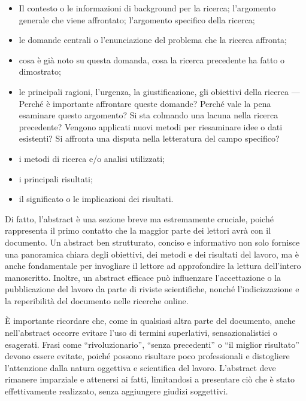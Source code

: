 \documentclass[9pt,a4paper,twoside]{rho-class/rho}
\begin{document}
\begin{itemize}
     \item Il contesto o le informazioni di background per la ricerca; l’argomento generale che viene affrontato; l’argomento specifico della ricerca;
     \item le domande centrali o l’enunciazione del problema che la ricerca affronta;
     \item cosa è già noto su questa domanda, cosa la ricerca precedente ha fatto o dimostrato;
     \item le principali ragioni, l’urgenza, la giustificazione, gli obiettivi della ricerca — Perché è importante affrontare queste domande? Perché vale la pena esaminare questo argomento? Si sta colmando una lacuna nella ricerca precedente? Vengono applicati nuovi metodi per riesaminare idee o dati esistenti? Si affronta una disputa nella letteratura del campo specifico?
     \item i metodi di ricerca e/o analisi utilizzati;
     \item i principali risultati;
     \item il significato o le implicazioni dei risultati.
 \end{itemize}

Di fatto, l’abstract è una sezione breve ma estremamente cruciale, poiché rappresenta il primo contatto che la maggior parte dei lettori avrà con il documento. Un abstract ben strutturato, conciso e informativo non solo fornisce una panoramica chiara degli obiettivi, dei metodi e dei risultati del lavoro, ma è anche fondamentale per invogliare il lettore ad approfondire la lettura dell’intero manoscritto. Inoltre, un abstract efficace può influenzare l’accettazione o la pubblicazione del lavoro da parte di riviste scientifiche, nonché l’indicizzazione e la reperibilità del documento nelle ricerche online.

È importante ricordare che, come in qualsiasi altra parte del documento, anche nell’abstract occorre evitare l’uso di termini superlativi, sensazionalistici o esagerati. Frasi come “rivoluzionario”, “senza precedenti” o “il miglior risultato” devono essere evitate, poiché possono risultare poco professionali e distogliere l’attenzione dalla natura oggettiva e scientifica del lavoro. L’abstract deve rimanere imparziale e attenersi ai fatti, limitandosi a presentare ciò che è stato effettivamente realizzato, senza aggiungere giudizi soggettivi.
\end{document}
